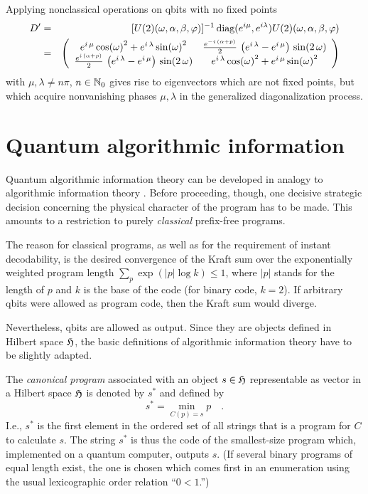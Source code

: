 Applying nonclassical operations on qbits with no fixed points
\begin{eqnarray}
D' &=&
[U(2)(\omega ,\alpha ,\beta ,\varphi )]^{-1}\,\mbox{diag}( e^{i\mu } ,
e^{i\lambda }) U(2)(\omega ,\alpha ,\beta ,\varphi )\nonumber \\ &=&
\left(
\begin{array}{cc}
  {e^{i\,\mu }}\,{{\cos (\omega )}^2} +
     {e^{i\,\lambda }}\,{{\sin (\omega )}^2}&
    {{{e^{-i\,\left( \alpha  + p \right) }\over 2}}\,
         \left( {e^{i\,\lambda }} - {e^{i\,\mu }} \right) \,\sin
(2\,\omega )}
       \\
{{{e^{i\,\left( \alpha  + p \right) }\over 2}}\,
        \left( {e^{i\,\lambda }} - {e^{i\,\mu }}  \right) \,\sin
(2\,\omega )}
       &{e^{i\,\lambda }}\,{{\cos (\omega )}^2} +
     {e^{i\,\mu }}\,{{\sin (\omega )}^2}
 \end{array}
\right)
\end{eqnarray}
with $\mu ,\lambda \neq n\pi$, $n\in {\Bbb N}_0$ gives rise to
eigenvectors which are not fixed points, but which acquire nonvanishing
phases $\mu , \lambda$ in the generalized diagonalization process.


\section{Quantum algorithmic information}


Quantum algorithmic information theory can be developed in analogy to
algorithmic information theory \cite{chaitin2,chaitin3,calude:94,li}.
Before proceeding, though, one decisive strategic decision concerning
the physical character of
the program has to be made. This amounts to a restriction to purely {\em
classical} prefix-free programs.

The reason for classical programs, as well as for the requirement of
instant decodability, is the desired convergence of the Kraft sum
over the exponentially weighted program length
$\sum_p \exp ({\vert p\vert \log k})\le 1$, where
$\vert p\vert$ stands for the length of $p$ and $k$ is the base of the
code (for binary code, $k=2$).
If arbitrary qbits were allowed as program code, then the Kraft sum
would diverge.

Nevertheless, qbits are allowed as output. Since they are objects
defined in Hilbert space ${\cal H}$, the basic definitions of
algorithmic information theory have to be slightly adapted.


 The {\em canonical program} associated with an object $s\in {\cal H}$
 representable as vector in a Hilbert space ${\cal H}$ is denoted by
$s^\ast$ and defined by
 \begin{equation} s^\ast =\min_{C(p)=s}p\quad .
 \end{equation}
 I.e., $s^\ast$ is the first element in the ordered
 set of all strings that is a program for $C$ to calculate $s$.
 The string $s^\ast$ is thus the code of the smallest-size program
 which, implemented on a quantum computer, outputs $s$.
 (If several binary programs of equal length exist,
 the one is chosen which comes first in an enumeration using the usual
 lexicographic order relation ``$0<1$.'')

